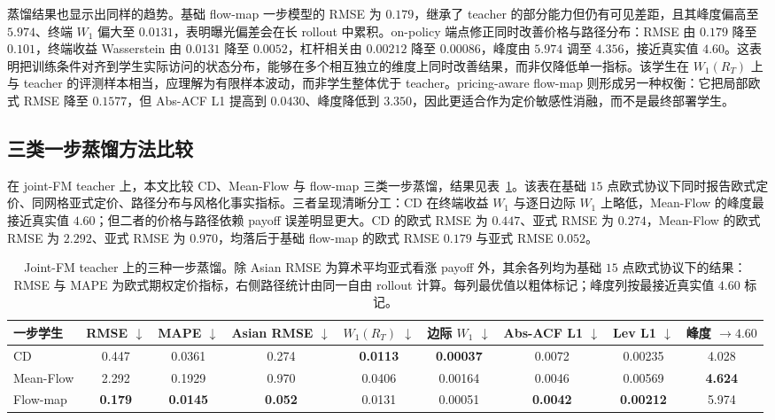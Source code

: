 \documentclass[11pt]{ctexart}
\newcommand{\tablebodysetup}{\footnotesize\setlength{\tabcolsep}{2pt}\renewcommand{\arraystretch}{1.12}}
\newcommand{\best}[1]{\textbf{#1}}
\begin{document}
蒸馏结果也显示出同样的趋势。基础 flow-map 一步模型的 RMSE 为 $0.179$，继承了 teacher 的部分能力但仍有可见差距，且其峰度偏高至 $5.974$、终端 $W_1$ 偏大至 $0.0131$，表明曝光偏差会在长 rollout 中累积。on-policy 端点修正同时改善价格与路径分布：RMSE 由 $0.179$ 降至 $0.101$，终端收益 Wasserstein 由 $0.0131$ 降至 $0.0052$，杠杆相关由 $0.00212$ 降至 $0.00086$，峰度由 $5.974$ 调至 $4.356$，接近真实值 $4.60$。这表明把训练条件对齐到学生实际访问的状态分布，能够在多个相互独立的维度上同时改善结果，而非仅降低单一指标。该学生在 $W_1(R_T)$ 上与 teacher 的评测样本相当，应理解为有限样本波动，而非学生整体优于 teacher。pricing-aware flow-map 则形成另一种权衡：它把局部欧式 RMSE 降至 $0.1577$，但 Abs-ACF L1 提高到 $0.0430$、峰度降低到 $3.350$，因此更适合作为定价敏感性消融，而不是最终部署学生。

\subsection{三类一步蒸馏方法比较}
\label{sec:res_distill}
在 joint-FM teacher 上，本文比较 CD、Mean-Flow 与 flow-map 三类一步蒸馏，结果见表~\ref{tab:distill_joint}。该表在基础 $15$ 点欧式协议下同时报告欧式定价、同网格亚式定价、路径分布与风格化事实指标。三者呈现清晰分工：CD 在终端收益 $W_1$ 与逐日边际 $W_1$ 上略低，Mean-Flow 的峰度最接近真实值 $4.60$；但二者的价格与路径依赖 payoff 误差明显更大。CD 的欧式 RMSE 为 $0.447$、亚式 RMSE 为 $0.274$，Mean-Flow 的欧式 RMSE 为 $2.292$、亚式 RMSE 为 $0.970$，均落后于基础 flow-map 的欧式 RMSE $0.179$ 与亚式 RMSE $0.052$。

\begin{table}[htbp]
\centering
\caption{Joint-FM teacher 上的三种一步蒸馏。除 Asian RMSE 为算术平均亚式看涨 payoff 外，其余各列均为基础 $15$ 点欧式协议下的结果：RMSE 与 MAPE 为欧式期权定价指标，右侧路径统计由同一自由 rollout 计算。每列最优值以粗体标记；峰度列按最接近真实值 $4.60$ 标记。}
\label{tab:distill_joint}
\tablebodysetup
\begin{tabular}{l c c c c c c c c}
\toprule
一步学生 & RMSE $\downarrow$ & MAPE $\downarrow$ & Asian RMSE $\downarrow$ & $W_1(R_T)$ $\downarrow$ & 边际 $W_1$ $\downarrow$ & Abs-ACF L1 $\downarrow$ & Lev L1 $\downarrow$ & 峰度 $\to4.60$ \\
\midrule
CD & 0.447 & 0.0361 & 0.274 & \best{0.0113} & \best{0.00037} & 0.0072 & 0.00235 & 4.028 \\
Mean-Flow & 2.292 & 0.1929 & 0.970 & 0.0406 & 0.00164 & 0.0046 & 0.00569 & \best{4.624} \\
Flow-map & \best{0.179} & \best{0.0145} & \best{0.052} & 0.0131 & 0.00051 & \best{0.0042} & \best{0.00212} & 5.974 \\
\bottomrule
\end{tabular}
\end{table}
\end{document}
